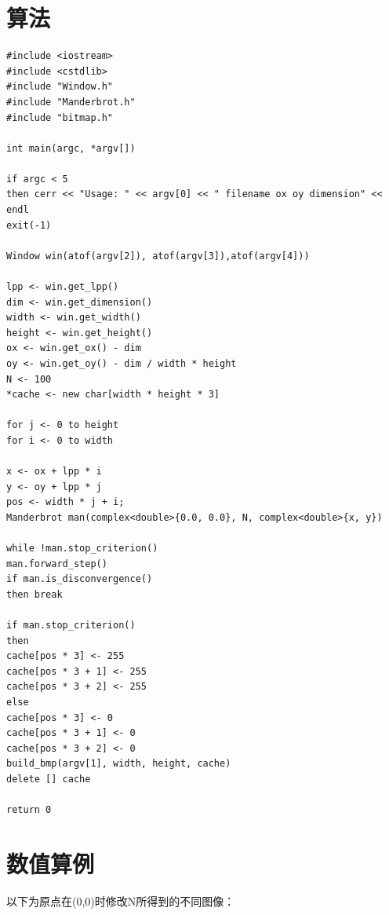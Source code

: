 \documentclass{ctexart}
\begin{document}
\section{算法}
\begin{verbatim}
#include <iostream>
#include <cstdlib>
#include "Window.h"
#include "Manderbrot.h"
#include "bitmap.h"

int main(argc, *argv[])

if argc < 5
then cerr << "Usage: " << argv[0] << " filename ox oy dimension" << endl
exit(-1)

Window win(atof(argv[2]), atof(argv[3]),atof(argv[4]))

lpp <- win.get_lpp()
dim <- win.get_dimension()
width <- win.get_width()
height <- win.get_height()
ox <- win.get_ox() - dim
oy <- win.get_oy() - dim / width * height
N <- 100
*cache <- new char[width * height * 3]

for j <- 0 to height
for i <- 0 to width

x <- ox + lpp * i
y <- oy + lpp * j
pos <- width * j + i;
Manderbrot man(complex<double>{0.0, 0.0}, N, complex<double>{x, y})

while !man.stop_criterion()
man.forward_step()
if man.is_disconvergence()
then break

if man.stop_criterion()
then 
cache[pos * 3] <- 255
cache[pos * 3 + 1] <- 255
cache[pos * 3 + 2] <- 255
else
cache[pos * 3] <- 0
cache[pos * 3 + 1] <- 0
cache[pos * 3 + 2] <- 0
build_bmp(argv[1], width, height, cache)
delete [] cache

return 0
\end{verbatim}

\section{数值算例}

以下为原点在(0,0)时修改N所得到的不同图像：
\begin{figure}[H]
\centering
{}
\end{figure}

\begin{figure}[H]
\centering
{}
\end{figure}
\end{document}
